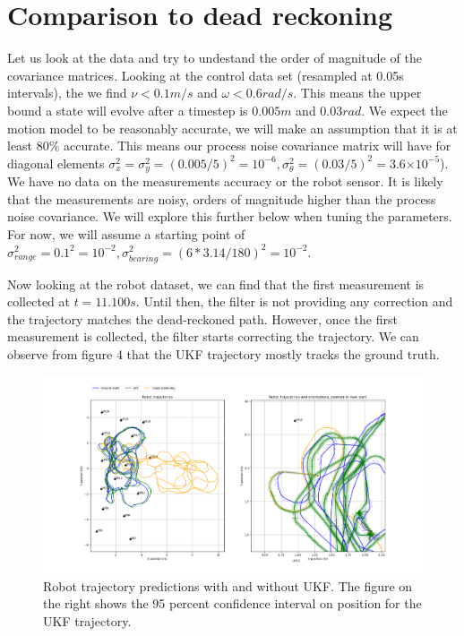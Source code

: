\documentclass{article}
\providecommand{\e}[1]{\ensuremath{\times 10^{#1}}}
\begin{document}
\section{Comparison to dead reckoning}
Let us look at the data and try to undestand the order of magnitude of the covariance matrices.
Looking at the control data set (resampled at 0.05s intervals), the we find $\nu<0.1m/s$ and $\omega<0.6rad/s$. This means the upper bound a state will evolve after a timestep is $0.005m$ and $0.03rad$. We expect the motion model to be reasonably accurate, we will make an assumption that it is at least 80\% accurate. This means our process noise covariance matrix will have for diagonal elements $\sigma_x^2=\sigma_y^2=(0.005/5)^2=10^{-6},\sigma_\theta^2=(0.03/5)^2=3.6\e{-5}$). We have no data on the measurements accuracy or the robot sensor. It is likely that the measurements are noisy, orders of magnitude higher than the process noise covariance. We will explore this further below when tuning the parameters. For now, we will assume a starting point of $\sigma_{range}^2=0.1^2=10^{-2}, \sigma_{bearing}^2=(6*3.14/180)^2=10^{-2}$.


Now looking at the robot dataset, we can find that the first measurement is collected at $t=11.100s$. Until then, the filter is not providing any correction and the trajectory matches the dead-reckoned path.
However, once the first measurement is collected, the filter starts correcting the trajectory. We can observe from figure 4 that the UKF trajectory mostly tracks the ground truth.

\begin{figure}
\centering
\includegraphics[scale=0.3]{Figure_4.png}
\caption{Robot trajectory predictions with and without UKF. The figure on the right shows the 95 percent confidence interval on position for the UKF trajectory.}
\end{figure}
\end{document}
